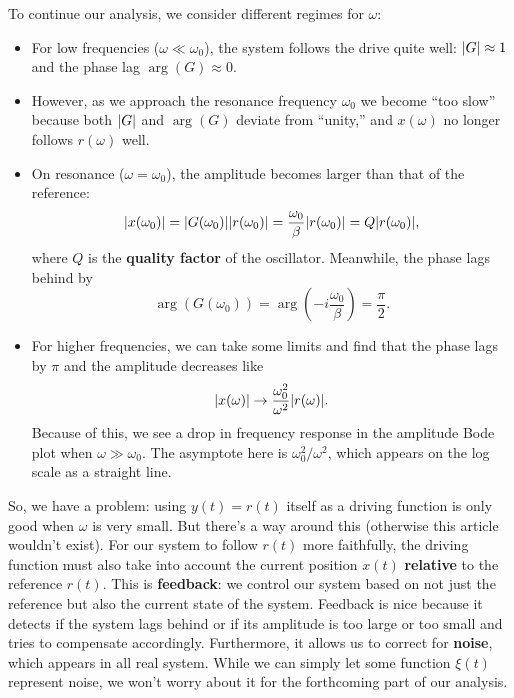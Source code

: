 \documentclass{article}
\theoremstyle{definition}
\newcommand{\f}[2]{\frac{#1}{#2}}
\newcommand{\lp}{\left(}
\newcommand{\rp}{\right)}
\begin{document}
To continue our analysis, we consider different regimes for $\omega$:
\begin{itemize}
	\item  For low frequencies ($\omega \ll \omega_0$), the system follows the drive quite well: $\abs{G} \approx 1$ and the phase lag $\arg(G) \approx 0$.
	
	\item However, as we approach the resonance frequency $\omega_0$ we become ``too slow'' because both $\abs{G}$ and $\arg(G)$ deviate from ``unity,'' and $x(\omega)$ no longer follows $r(\omega)$ well.
	
	
	\item  On resonance ($\omega = \omega_0$), the amplitude becomes larger than that of the reference: 
	\begin{equation*}
	\abs{x(\omega_0)} = \abs{G(\omega_0)}\abs{r(\omega_0)} = \f{\omega_0}{\beta} \abs{r(\omega_0)} = Q\abs{r(\omega_0)}, 
	\end{equation*}
	where $Q$ is the \textbf{quality factor} of the oscillator. Meanwhile, the phase lags behind by 
	\begin{equation*}
	\arg(G(\omega_0)) = \arg\lp -i\f{\omega_0}{\beta} \rp = \f{\pi}{2}.
	\end{equation*}
	
	
	\item For higher frequencies, we can take some limits and find that the phase lags by $\pi$ and the amplitude decreases like 
	\begin{equation*}
	\abs{x(\omega)} \to \f{\omega_0^2}{\omega^2}\abs{r(\omega)}.
	\end{equation*}
	Because of this, we see a drop in frequency response in the amplitude Bode plot when $\omega \gg \omega_0$. The asymptote here is $\omega_0^2/\omega^2$, which appears on the log scale as a straight line. 
\end{itemize}




So, we have a problem: using $y(t) = r(t)$ itself as a driving function is only good when $\omega$ is very small. But there's a way around this (otherwise this article wouldn't exist). For our system to follow $r(t)$ more faithfully, the driving function must also take into account the current position $x(t)$ \textbf{relative} to the reference $r(t)$. This is \textbf{feedback}: we control our system based on not just the reference but also the current state of the system. Feedback is nice because it detects if the system lags behind or if its amplitude is too large or too small and tries to compensate accordingly. Furthermore, it allows us to correct for \textbf{noise}, which appears in all real system. While we can simply let some function $\xi(t)$ represent noise, we won't worry about it for the forthcoming part of our analysis. \\
\end{document}
